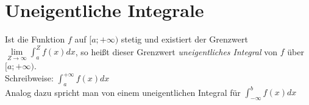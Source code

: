 \section{Uneigentliche Integrale}
\begin{Definition}
  Ist die Funktion $f$ auf $[a;+\infty)$ stetig und existiert der Grenzwert $\lim\limits_{Z \rightarrow \infty} \int_a^Z f(x)dx$,
  so heißt dieser Grenzwert \emph{uneigentliches Integral} von $f$ über $[a;+\infty)$.\\
  Schreibweise: $\int_a^{+\infty} f(x)dx$\\
  Analog dazu spricht man von einem uneigentlichen Integral für $\int_{-\infty}^b f(x)dx$
\end{Definition}
